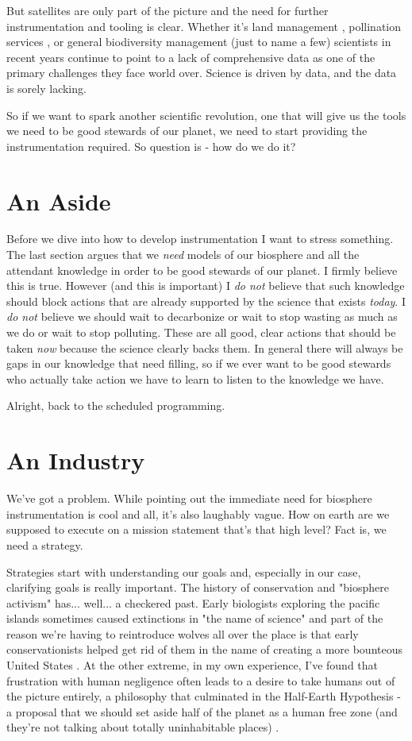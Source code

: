 \documentclass[11pt]{book}
\begin{document}
But satellites are only part of the picture and the need for further instrumentation and tooling is clear. Whether it's land management \cite{jpongratz}, pollination services \cite{ibartomeus}, or general biodiversity management \cite{hkuhl} (just to name a few) scientists in recent years continue to point to a lack of comprehensive data as one of the primary challenges they face world over. Science is driven by data, and the data is sorely lacking. 
\newline

So if we want to spark another scientific revolution, one that will give us the tools we need to be good stewards of our planet, we need to start providing the instrumentation required. So question is - how do we do it?

\section{An Aside}
Before we dive into how to develop instrumentation I want to stress something. The last section argues that we \textit{need} models of our biosphere and all the attendant knowledge in order to be good stewards of our planet. I firmly believe this is true. However (and this is important) I \textit{do not} believe that such knowledge should block actions that are already supported by the science that exists \textit{today}. I \textit{do not} believe we should wait to decarbonize or wait to stop wasting as much as we do or wait to stop polluting. These are all good, clear actions that should be taken \textit{now} because the science clearly backs them. In general there will always be gaps in our knowledge that need filling, so if we ever want to be good stewards who actually take action we have to learn to listen to the knowledge we have. 

Alright, back to the scheduled programming. 

\section{An Industry}
We've got a problem. While pointing out the immediate need for biosphere instrumentation is cool and all, it's also laughably vague. How on earth are we supposed to execute on a mission statement that's that high level? Fact is, we need a strategy. 

Strategies start with understanding our goals and, especially in our case, clarifying goals is really important. The history of conservation and "biosphere activism" has... well... a checkered past. Early biologists exploring the pacific islands sometimes caused extinctions in "the name of science" and part of the reason we're having to reintroduce wolves all over the place is that early conservationists helped get rid of them in the name of creating a more bounteous United States \cite{mnijhuis}. At the other extreme, in my own experience, I've found that frustration with human negligence often leads to a desire to take humans out of the picture entirely, a philosophy that culminated in the Half-Earth Hypothesis - a proposal that we should set aside half of the planet as a human free zone (and they're not talking about totally uninhabitable places) \cite{ewilson}. 
\end{document}

